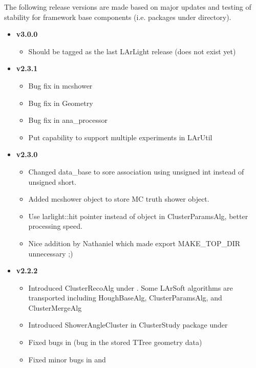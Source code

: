 The following release versions are made based on major updates and testing of stability for framework base components (i.e. packages under \Core directory). 
\begin{itemize}

\item[] {\bf v3.0.0}
  \begin{itemize}
  \item Should be tagged as the last LArLight release (does not exist yet)
  \end{itemize}

\item[] {\bf v2.3.1}
  \begin{itemize}
  \item Bug fix in {\ttfamily mcshower} 
  \item Bug fix in {\ttfamily Geometry}
  \item Bug fix in {\ttfamily ana\_processor}
  \item Put capability to support multiple experiments in {\ttfamily LArUtil}
  \end{itemize}


\item[] {\bf v2.3.0}
  \begin{itemize}
    \item Changed {\ttfamily data\_base} to sore association using {\ttfamily unsigned int} instead of {\ttfamily unsigned short}.
    \item Added {\ttfamily mcshower} object to store MC truth shower object.
    \item Use {\ttfamily larlight::hit} pointer instead of object in {\ttfamily ClusterParamsAlg}, better processing speed.
    \item Nice addition by Nathaniel which made {\ttfamily export MAKE\_TOP\_DIR} unnecessary ;)
  \end{itemize}

\item[] {\bf v2.2.2}
  \begin{itemize}
    \item Introduced ClusterRecoAlg under \UserDev. Some LArSoft algorithms are transported including HoughBaseAlg, ClusterParamsAlg, and ClusterMergeAlg
    \item Introduced ShowerAngleCluster in ClusterStudy package under \UserDev
    \item Fixed bugs in \LArUtil (bug in the stored TTree geometry data)
    \item Fixed minor bugs in \DataFormat and \Analysis
  \end{itemize}


\end{itemize}

